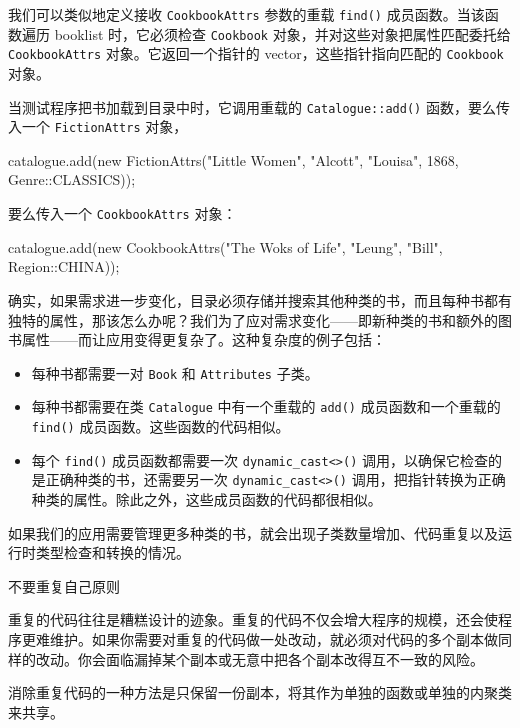 我们可以类似地定义接收 \texttt{Cookbook\allowbreak{}Attrs} 参数的重载 \texttt{find()} 成员函数。当该函数遍历 booklist 时，它必须检查 \texttt{Cookbook} 对象，并对这些对象把属性匹配委托给 \texttt{Cookbook\allowbreak{}Attrs} 对象。它返回一个指针的 vector，这些指针指向匹配的 \texttt{Cookbook} 对象。

当测试程序把书加载到目录中时，它调用重载的 \texttt{Catalogue::\allowbreak{}add(\allowbreak{})\allowbreak{}} 函数，要么传入一个 \texttt{Fiction\allowbreak{}Attrs} 对象，

\begin{codebox}
    catalogue.add(new FictionAttrs("Little Women",
                                   "Alcott", "Louisa",
                                   1868, Genre::CLASSICS));
\end{codebox}

要么传入一个 \texttt{Cookbook\allowbreak{}Attrs} 对象：

\begin{codebox}
    catalogue.add(new CookbookAttrs("The Woks of Life",
                                    "Leung", "Bill", Region::CHINA));
\end{codebox}


确实，如果需求进一步变化，目录必须存储并搜索其他种类的书，而且每种书都有独特的属性，那该怎么办呢？我们为了应对需求变化——即新种类的书和额外的图书属性——而让应用变得更复杂了。这种复杂度的例子包括：

\begin{itemize}
\item 每种书都需要一对 \texttt{Book} 和 \texttt{Attributes} 子类。
\item 每种书都需要在类 \texttt{Catalogue} 中有一个重载的 \texttt{add()} 成员函数和一个重载的 \texttt{find()} 成员函数。这些函数的代码相似。
\item 每个 \texttt{find()} 成员函数都需要一次 \texttt{dynamic\_\allowbreak{}cast<>(\allowbreak{})\allowbreak{}} 调用，以确保它检查的是正确种类的书，还需要另一次 \texttt{dynamic\_\allowbreak{}cast<>(\allowbreak{})\allowbreak{}} 调用，把指针转换为正确种类的属性。除此之外，这些成员函数的代码都很相似。
\end{itemize}

如果我们的应用需要管理更多种类的书，就会出现子类数量增加、代码重复以及运行时类型检查和转换的情况。

\begin{mySidebar}{不要重复自己原则}

重复的代码往往是糟糕设计的迹象。重复的代码不仅会增大程序的规模，还会使程序更难维护。如果你需要对重复的代码做一处改动，就必须对代码的多个副本做同样的改动。你会面临漏掉某个副本或无意中把各个副本改得互不一致的风险。

消除重复代码的一种方法是只保留一份副本，将其作为单独的函数或单独的内聚类来共享。
\end{mySidebar}

